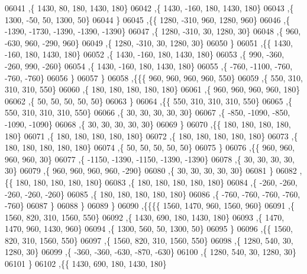 \begin{DoxyCode}
06041     ,\{  1430,    80,   180,  1430,   180\}
06042     ,\{  1430,  -160,   180,  1430,   180\}
06043     ,\{  1300,   -50,    50,  1300,    50\}
06044     \}
06045    ,\{\{  1280,  -310,   960,  1280,   960\}
06046     ,\{ -1390, -1730, -1390, -1390, -1390\}
06047     ,\{  1280,  -310,    30,  1280,    30\}
06048     ,\{   960,  -630,   960,  -290,   960\}
06049     ,\{  1280,  -310,    30,  1280,    30\}
06050     \}
06051    ,\{\{  1430,  -160,   180,  1430,   180\}
06052     ,\{  1430,  -160,   180,  1430,   180\}
06053     ,\{   990,  -360,  -260,   990,  -260\}
06054     ,\{  1430,  -160,   180,  1430,   180\}
06055     ,\{  -760, -1100,  -760,  -760,  -760\}
06056     \}
06057    \}
06058   ,\{\{\{   960,   960,   960,   960,   550\}
06059     ,\{   550,   310,   310,   310,   550\}
06060     ,\{   180,   180,   180,   180,   180\}
06061     ,\{   960,   960,   960,   960,   180\}
06062     ,\{    50,    50,    50,    50,    50\}
06063     \}
06064    ,\{\{   550,   310,   310,   310,   550\}
06065     ,\{   550,   310,   310,   310,   550\}
06066     ,\{    30,    30,    30,    30,    30\}
06067     ,\{  -850, -1090,  -850, -1090, -1090\}
06068     ,\{    30,    30,    30,    30,    30\}
06069     \}
06070    ,\{\{   180,   180,   180,   180,   180\}
06071     ,\{   180,   180,   180,   180,   180\}
06072     ,\{   180,   180,   180,   180,   180\}
06073     ,\{   180,   180,   180,   180,   180\}
06074     ,\{    50,    50,    50,    50,    50\}
06075     \}
06076    ,\{\{   960,   960,   960,   960,    30\}
06077     ,\{ -1150, -1390, -1150, -1390, -1390\}
06078     ,\{    30,    30,    30,    30,    30\}
06079     ,\{   960,   960,   960,   960,  -290\}
06080     ,\{    30,    30,    30,    30,    30\}
06081     \}
06082    ,\{\{   180,   180,   180,   180,   180\}
06083     ,\{   180,   180,   180,   180,   180\}
06084     ,\{  -260,  -260,  -260,  -260,  -260\}
06085     ,\{   180,   180,   180,   180,   180\}
06086     ,\{  -760,  -760,  -760,  -760,  -760\}
06087     \}
06088    \}
06089   \}
06090  ,\{\{\{\{  1560,  1470,   960,  1560,   960\}
06091     ,\{  1560,   820,   310,  1560,   550\}
06092     ,\{  1430,   690,   180,  1430,   180\}
06093     ,\{  1470,  1470,   960,  1430,   960\}
06094     ,\{  1300,   560,    50,  1300,    50\}
06095     \}
06096    ,\{\{  1560,   820,   310,  1560,   550\}
06097     ,\{  1560,   820,   310,  1560,   550\}
06098     ,\{  1280,   540,    30,  1280,    30\}
06099     ,\{  -360,  -360,  -630,  -870,  -630\}
06100     ,\{  1280,   540,    30,  1280,    30\}
06101     \}
06102    ,\{\{  1430,   690,   180,  1430,   180\}

\end{DoxyCode}

